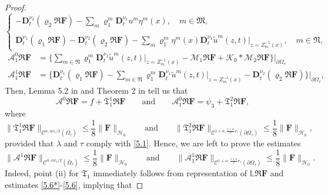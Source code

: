 \documentclass[reqno]{amsart}
\def\C {\mathcal{C}}
\theoremstyle{definition}
\numberwithin{equation}{section}
\begin{document}
\begin{proof}
\[\begin{cases}
-
\mathbf{D}_{t}^{\nu_{2}}(\varrho_2\mathfrak{R}\mathbf{F})
-\sum_{m}\varrho_{1}^{m}\mathbf{D}_{t}^{\nu_{1}}u^{m}\eta^{m}(x),\quad m\in\mathfrak{M},\\
\\
\mathbf{D}_{t}^{\nu_{1}}(\varrho_{1}\mathfrak{R}\mathbf{F})
-
\mathbf{D}_{t}^{\nu_{2}}(\varrho_2\mathfrak{R}\mathbf{F})
-\sum_{m}\varrho_{1}^{m}\eta^{m}(x)\mathbf{D}_{t}^{\nu_{1}}\tilde{u}^{m}(z,t)|_{z=Z_{m}^{-1}(x)},\quad m\in\mathfrak{N},
\end{cases}
\]
\begin{align*}
\mathcal{A}^{0}_{1}\mathfrak{R}\mathbf{F}&=\bigg\{
\sum_{m\in\mathfrak{N}}\varrho_{1}^{m}\mathbf{D}_{t}^{\nu_{1}}\tilde{u}^{m}(z,t)|_{z=Z_{m}^{-1}(x)}-\mathcal{M}_{1}\mathfrak{R}\mathbf{F}
+\mathcal{K}_0*\mathcal{M}_{2}\mathfrak{R}\mathbf{F}
\bigg\}\bigg|_{\partial\Omega_{\tau}}\\
\mathcal{A}^{1}_{1}\mathfrak{R}\mathbf{F}&=\bigg\{
\mathbf{D}_{t}^{\nu_{1}}(\varrho_1\mathfrak{R}\mathbf{F})
-\sum_{m\in\mathfrak{N}}\varrho_1^{m}\mathbf{D}_{t}^{\nu_{1}}\tilde{u}^{m}(z,t)|_{z=Z_{m}^{-1}(x)}
-
\mathbf{D}_{t}^{\nu_{2}}(\varrho_2\mathfrak{R}\mathbf{F})\bigg\}\bigg|_{\partial\Omega_{\tau}},
\end{align*}
Then, Lemma 5.2 in \cite{KPV1} and Theorem 2 in \cite{K2} tell us that
$$
\mathcal{A}^{0}\mathfrak{R}\mathbf{F}=f+\mathfrak{T}_{1}^{1} \mathfrak{R}\mathbf{F}
\qquad
\text{and}\qquad
\mathcal{A}_{1}^{0}\mathfrak{R}\mathbf{F}=\psi_{3}+\mathfrak{T}_{1}^{2} \mathfrak{R}\mathbf{F},
$$
where
\begin{equation}\label{5.6*}\|\mathfrak{T}_{1}^{1} \mathfrak{R}\mathbf{F}\|_{\C^{\alpha,\alpha\nu_{1}/2}(\bar{\Omega}_{\tau})}
\leq\frac{1}{8}\|\mathbf{F}\|_{\mathcal{H}_{0}}\qquad
\text{and}\qquad
\|\mathfrak{T}_{1}^{2} \mathfrak{R}\mathbf{F}\|_{\C^{1+\alpha,\frac{1+\alpha}{2}\nu_{1}}(\partial\Omega_{\tau})}\leq\frac{1}{8}\|\mathbf{F}\|_{\mathcal{H}_{0}},
\end{equation}
provided that $\lambda$ and $\tau$ comply with \eqref{5.1}.
Hence, we are left to prove the estimates
\begin{equation}\label{5.6}
\|\mathcal{A}^{1} \mathfrak{R}\mathbf{F}\|_{\C^{\alpha,\alpha\nu_{1}/2}(\bar{\Omega}_{\tau})}\leq\frac{1}{8}\|\mathbf{F}\|_{\mathcal{H}_{0}}
\qquad
\text{and}\qquad
\|\mathcal{A}^{1}_{1} \mathfrak{R}\mathbf{F}\|_{\C^{1+\alpha,\frac{1+\alpha}{2}\nu_{1}}(\partial\Omega_{\tau})}\leq\frac{1}{8}\|\mathbf{F}\|_{\mathcal{H}_{0}}.
\end{equation}
Indeed, point (ii) for $\mathfrak{T}_{1}$ immediately follows from representation of $\mathbb{L}\mathfrak{R}\mathbf{F}$ and estimates \eqref{5.6*}-\eqref{5.6}, implying that

\end{proof}
\end{document}
